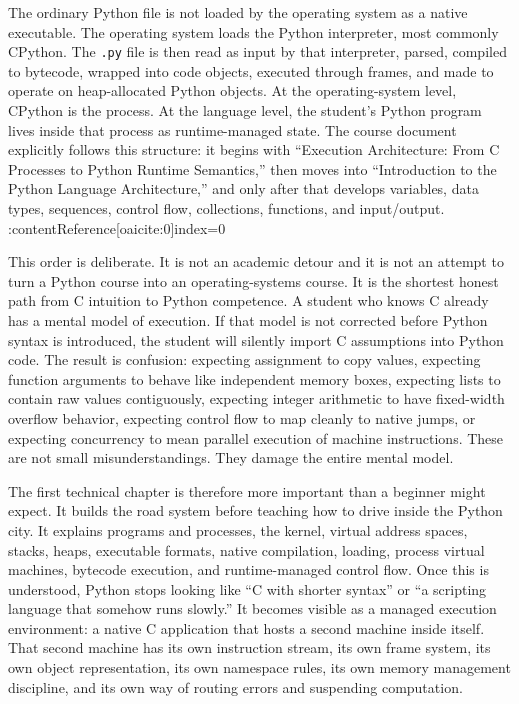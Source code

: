 The ordinary Python file is not loaded by the operating system as a native executable. The operating system loads the Python interpreter, most commonly CPython. The \texttt{.py} file is then read as input by that interpreter, parsed, compiled to bytecode, wrapped into code objects, executed through frames, and made to operate on heap-allocated Python objects. At the operating-system level, CPython is the process. At the language level, the student’s Python program lives inside that process as runtime-managed state. The course document explicitly follows this structure: it begins with “Execution Architecture: From C Processes to Python Runtime Semantics,” then moves into “Introduction to the Python Language Architecture,” and only after that develops variables, data types, sequences, control flow, collections, functions, and input/output. :contentReference[oaicite:0]{index=0}

This order is deliberate. It is not an academic detour and it is not an attempt to turn a Python course into an operating-systems course. It is the shortest honest path from C intuition to Python competence. A student who knows C already has a mental model of execution. If that model is not corrected before Python syntax is introduced, the student will silently import C assumptions into Python code. The result is confusion: expecting assignment to copy values, expecting function arguments to behave like independent memory boxes, expecting lists to contain raw values contiguously, expecting integer arithmetic to have fixed-width overflow behavior, expecting control flow to map cleanly to native jumps, or expecting concurrency to mean parallel execution of machine instructions. These are not small misunderstandings. They damage the entire mental model.

The first technical chapter is therefore more important than a beginner might expect. It builds the road system before teaching how to drive inside the Python city. It explains programs and processes, the kernel, virtual address spaces, stacks, heaps, executable formats, native compilation, loading, process virtual machines, bytecode execution, and runtime-managed control flow. Once this is understood, Python stops looking like “C with shorter syntax” or “a scripting language that somehow runs slowly.” It becomes visible as a managed execution environment: a native C application that hosts a second machine inside itself. That second machine has its own instruction stream, its own frame system, its own object representation, its own namespace rules, its own memory management discipline, and its own way of routing errors and suspending computation.

